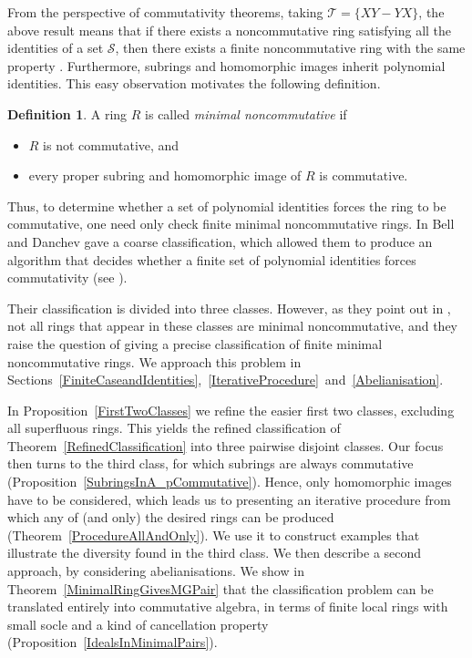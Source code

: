 \documentclass[11pt]{article}
\theoremstyle{definition}
\newtheorem{definition}[corollary]{Definition}
\begin{document}
From the perspective of commutativity theorems, taking $\mathcal{T}=\lbrace XY-YX\rbrace$, the above result means that if there exists a noncommutative ring satisfying all the identities of a set $\mathcal{S}$, then there exists a finite noncommutative ring with the same property \cite[Theorem~2.4]{BellandDanchev}. Furthermore, subrings and homomorphic images inherit polynomial identities. This easy observation motivates the following definition.

\begin{definition}
A ring $R$ is called \textit{minimal noncommutative} if
\begin{itemize}[topsep=0pt]
\item[(1)] $R$ is not commutative, and
\item[(2)] every proper subring and homomorphic image of $R$ is commutative.
\end{itemize}
\end{definition}

Thus, to determine whether a set of polynomial identities forces the ring to be commutative, one need only check finite minimal noncommutative rings. In \cite[Theorem~2.5]{BellandDanchev} Bell and Danchev gave a coarse classification, which allowed them to produce an algorithm that decides whether a finite set of polynomial identities forces commutativity (see \cite[Section~3]{BellandDanchev}).

Their classification is divided into three classes. However, as they point out in \cite[Remark~2.6]{BellandDanchev}, not all rings that appear in these classes are minimal noncommutative, and they raise the question of giving a precise classification of finite minimal noncommutative rings. We approach this problem in Sections~\ref{FiniteCaseandIdentities},~\ref{IterativeProcedure}~and~\ref{Abelianisation}.

In Proposition~\ref{FirstTwoClasses} we refine the easier first two classes, excluding all superfluous rings. This yields the refined classification of Theorem~\ref{RefinedClassification} into three pairwise disjoint classes. Our focus then turns to the third class, for which subrings are always commutative (Proposition~\ref{SubringsInA_pCommutative}). Hence, only homomorphic images have to be considered, which leads us to presenting an iterative procedure from which any of (and only) the desired rings can be produced (Theorem~\ref{ProcedureAllAndOnly}). We use it to construct examples that illustrate the diversity found in the third class. We then describe a second approach, by considering abelianisations. We show in Theorem~\ref{MinimalRingGivesMGPair} that the classification problem can be translated entirely into commutative algebra, in terms of finite local rings with small socle and a kind of cancellation property (Proposition~\ref{IdealsInMinimalPairs}).
\end{document}
